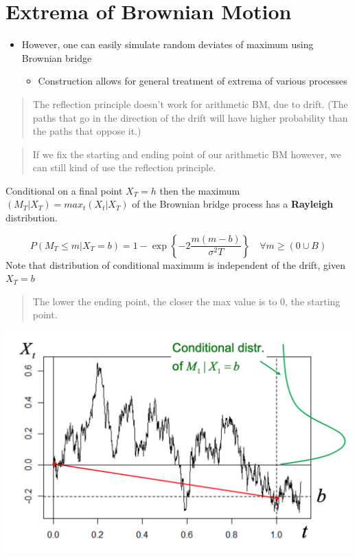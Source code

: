 \documentclass[
  oneside]{book}
\providecommand{\tightlist}{%
  \setlength{\itemsep}{0pt}\setlength{\parskip}{0pt}}
\begin{document}
\hypertarget{extrema-of-brownian-motion}{%
\section{Extrema of Brownian Motion}\label{extrema-of-brownian-motion}}

\begin{itemize}
\tightlist
\item
  However, one can easily simulate random deviates of maximum using Brownian bridge

  \begin{itemize}
  \tightlist
  \item
    Construction allows for general treatment of extrema of various processes
  \end{itemize}
\end{itemize}

\begin{quote}
The reflection principle doesn't work for arithmetic BM, due to drift. (The paths that go in the direction of the drift will have higher probability than the paths that oppose it.)
\end{quote}

\begin{quote}
If we fix the starting and ending point of our arithmetic BM however, we can still kind of use the reflection principle.
\end{quote}

Conditional on a final point \(X_{T} = h\) then the maximum \((M_{T}|X_{T}) = max_{t}(X_{t}|X_{T})\) of the Brownian bridge process has a \textbf{Rayleigh} distribution.

\[
P(M_{T}\leq m | X_{T} = b) = 1 - \exp \left\{ -2 \frac{m(m-b)}{\sigma^{2}T} \right\}  \quad \forall m\geq (0 \cup B)
\]
Note that distribution of conditional maximum is independent of the drift, given \(X_{T}=b\)

\begin{quote}
The lower the ending point, the closer the max value is to 0, the starting point.
\end{quote}

\includegraphics{Notes/Obsidian-Attachments/11-Pricing-Derivatives-3.png}
\end{document}
